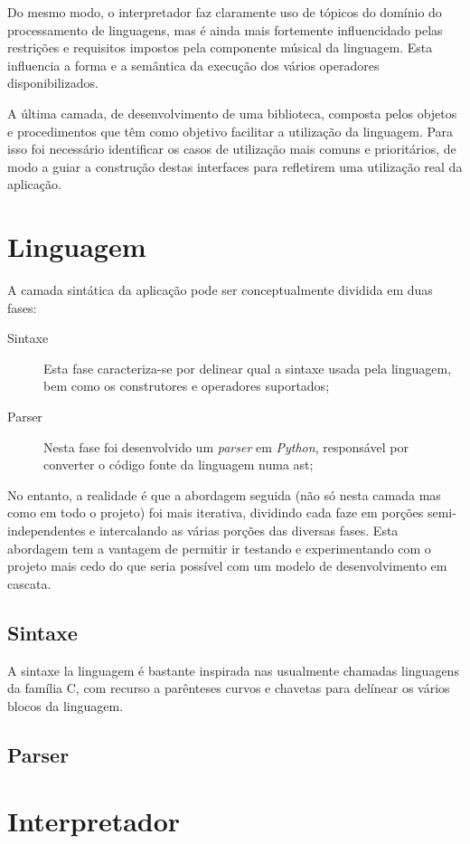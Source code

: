 \documentclass[
  oneside,
  11pt, a4paper,
  footinclude=true,
  headinclude=true,
  cleardoublepage=empty
]{scrbook}
\begin{document}
	Do mesmo modo, o interpretador faz claramente uso de tópicos do domínio do processamento de linguagens, mas é ainda mais fortemente influencidado pelas restrições  e requisitos impostos pela componente músical da linguagem. Esta influencia a forma e a semântica da execução dos vários operadores disponibilizados.
	
	A última camada, de desenvolvimento de uma biblioteca, composta pelos objetos e procedimentos que têm como objetivo facilitar a utilização da linguagem. Para isso foi necessário identificar os casos de utilização mais comuns e prioritários, de modo a guiar a construção destas interfaces para refletirem uma utilização real da aplicação.
	
	\section{Linguagem}
	A camada sintática da aplicação pode ser conceptualmente dividida em duas fases:
	\begin{description}
	 \item[Sintaxe] Esta fase caracteriza-se por delinear qual a sintaxe usada pela linguagem, bem como os construtores e operadores suportados;
	 \item[Parser] Nesta fase foi desenvolvido um \textit{parser} em \textit{Python}, responsável por converter o código fonte da linguagem numa \acrfull{ast};
	\end{description}
	
	No entanto, a realidade é que a abordagem seguida (não só nesta camada mas como em todo o projeto) foi mais iterativa, dividindo cada faze em porções semi-independentes e intercalando as várias porções das diversas fases. Esta abordagem tem a vantagem de permitir ir testando e experimentando com o projeto mais cedo do que seria possível com um modelo de desenvolvimento em cascata.
	\subsection{Sintaxe}
	A sintaxe la linguagem é bastante inspirada nas usualmente chamadas linguagens da família C, com recurso a parênteses curvos e chavetas para delínear os vários blocos da linguagem.
	
	\subsection{Parser}
	\section{Interpretador}
\end{document}
